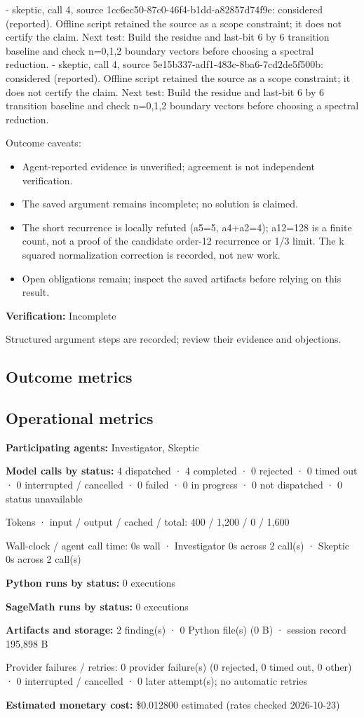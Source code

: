 \documentclass[11pt]{article}
\begin{document}
- skeptic, call 4, source 1cc6ec50-87c0-46f4-b1dd-a82857d74f9e: considered (reported). Offline script retained the source as a scope constraint; it does not certify the claim. Next test: Build the residue and last-bit 6 by 6 transition baseline and check n=0,1,2 boundary vectors before choosing a spectral reduction.
- skeptic, call 4, source 5e15b337-adf1-483c-8ba6-7cd2de5f500b: considered (reported). Offline script retained the source as a scope constraint; it does not certify the claim. Next test: Build the residue and last-bit 6 by 6 transition baseline and check n=0,1,2 boundary vectors before choosing a spectral reduction.\par
Outcome caveats:\par
\begin{itemize}
\item Agent-reported evidence is unverified; agreement is not independent verification.
\item The saved argument remains incomplete; no solution is claimed.
\item The short recurrence is locally refuted (a5=5, a4+a2=4); a12=128 is a finite count, not a proof of the candidate order-12 recurrence or 1/3 limit. The k squared normalization correction is recorded, not new work.
\item Open obligations remain; inspect the saved artifacts before relying on this result.
\end{itemize}
\textbf{Verification:} Incomplete\par
Structured argument steps are recorded; review their evidence and objections.\par
\subsection{Outcome metrics}
\subsection{Operational metrics}
\textbf{Participating agents:} Investigator, Skeptic\par
\textbf{Model calls by status:} 4 dispatched · 4 completed · 0 rejected · 0 timed out · 0 interrupted / cancelled · 0 failed · 0 in progress · 0 not dispatched · 0 status unavailable\par
Tokens · input / output / cached / total: 400 / 1,200 / 0 / 1,600\par
Wall-clock / agent call time: 0s wall · Investigator 0s across 2 call(s) · Skeptic 0s across 2 call(s)\par
\textbf{Python runs by status:} 0 executions\par
\textbf{SageMath runs by status:} 0 executions\par
\textbf{Artifacts and storage:} 2 finding(s) · 0 Python file(s) (0 B) · session record 195,898 B\par
Provider failures / retries: 0 provider failure(s) (0 rejected, 0 timed out, 0 other) · 0 interrupted / cancelled · 0 later attempt(s); no automatic retries\par
\textbf{Estimated monetary cost:} \$0.012800 estimated (rates checked 2026-10-23)\par
\end{document}
